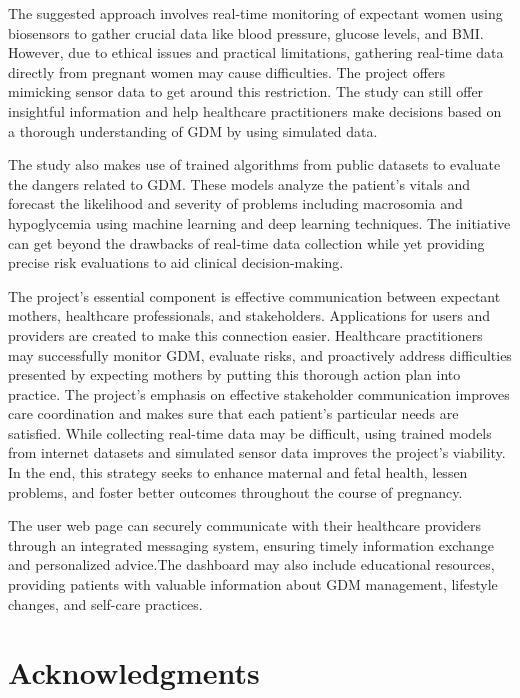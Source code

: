 \documentclass[conference,compsoc]{IEEEtran}
\begin{document}
The suggested approach involves real-time monitoring of expectant women using biosensors to gather crucial data like blood pressure, glucose levels, and BMI. However, due to ethical issues and practical limitations, gathering real-time data directly from pregnant women may cause difficulties. The project offers mimicking sensor data to get around this restriction. The study can still offer insightful information and help healthcare practitioners make decisions based on a thorough understanding of GDM by using simulated data.

The study also makes use of trained algorithms from public datasets to evaluate the dangers related to GDM. These models analyze the patient's vitals and forecast the likelihood and severity of problems including macrosomia and hypoglycemia using machine learning and deep learning techniques. The initiative can get beyond the drawbacks of real-time data collection while yet providing precise risk evaluations to aid clinical decision-making.

The project's essential component is effective communication between expectant mothers, healthcare professionals, and stakeholders. Applications for users and providers are created to make this connection easier. Healthcare practitioners may successfully monitor GDM, evaluate risks, and proactively address difficulties presented by expecting mothers by putting this thorough action plan into practice. The project's emphasis on effective stakeholder communication improves care coordination and makes sure that each patient's particular needs are satisfied. While collecting real-time data may be difficult, using trained models from internet datasets and simulated sensor data improves the project's viability. In the end, this strategy seeks to enhance maternal and fetal health, lessen problems, and foster better outcomes throughout the course of pregnancy.

The user web page can securely communicate with their healthcare providers through an integrated messaging system, ensuring timely information exchange and personalized advice.The dashboard may also include educational resources, providing patients with valuable information about GDM management, lifestyle changes, and self-care practices.




\ifCLASSOPTIONcompsoc
  \section*{Acknowledgments}
\else
\end{document}
